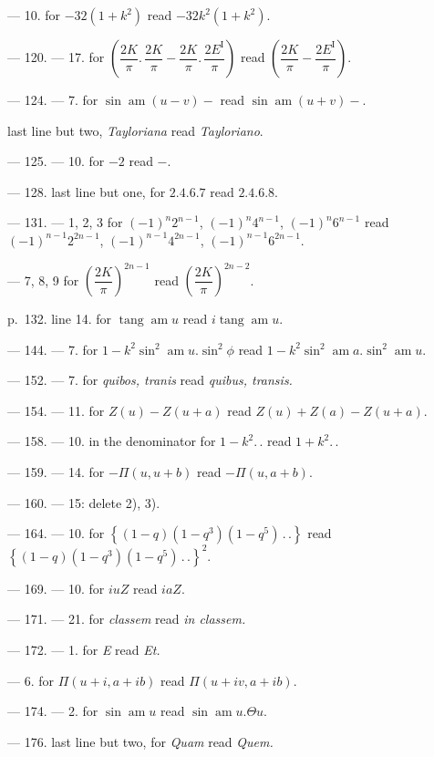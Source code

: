 \documentclass{article}
\begin{document}
--- 10. for $-32(1+k^{2})$ read $-32k^{2}(1+k^{2})$.

--- 120. --- 17. for $\left(\dfrac{2K}{\pi}.\,\dfrac{2K}{\pi}-\dfrac{2K}{\pi}.\,\dfrac{2E^{\mathrm{I}}}{\pi}\right)$ read $\left(\dfrac{2K}{\pi}-\dfrac{2E^{\mathrm{I}}}{\pi}\right)$.

--- 124. --- 7. for $\sin\operatorname{am}(u-v)-$ read $\sin\operatorname{am}(u+v)-$.

last line but two, \emph{Tayloriana} read \emph{Tayloriano}.

--- 125. --- 10. for $-2$ read $-$.

--- 128. last line but one, for $2.4.6.7$ read $2.4.6.8$.

--- 131. --- 1, 2, 3 for $(-1)^{n}2^{n-1}$, $(-1)^{n}4^{n-1}$, $(-1)^{n}6^{n-1}$ read $(-1)^{n-1}2^{2n-1}$, $(-1)^{n-1}4^{2n-1}$, $(-1)^{n-1}6^{2n-1}$.

--- 7, 8, 9 for $\left(\dfrac{2K}{\pi}\right)^{2n-1}$ read $\left(\dfrac{2K}{\pi}\right)^{2n-2}$.


p.\ 132. line 14. for $\operatorname{tang}\operatorname{am}u$ read $i\operatorname{tang}\operatorname{am}u$.

--- 144. --- 7. for $1-k^{2}\sin^{2}\operatorname{am}u.\sin^{2}\phi$ read $1-k^{2}\sin^{2}\operatorname{am}a.\sin^{2}\operatorname{am}u$.

--- 152. --- 7. for \emph{quibos, tranis} read \emph{quibus, transis.}

--- 154. --- 11. for $Z(u)-Z(u+a)$ read $Z(u)+Z(a)-Z(u+a)$.

--- 158. --- 10. in the denominator for $1-k^{2}.\,.$ read $1+k^{2}.\,.$

--- 159. --- 14. for $-\Pi(u,u+b)$ read $-\Pi(u,a+b)$.

--- 160. --- 15: delete 2), 3).

--- 164. --- 10. for $\left\{(1-q)(1-q^{3})(1-q^{5})\,.\,.\right\}$ read $\left\{(1-q)(1-q^{3})(1-q^{5})\,.\,.\right\}^{2}$.

--- 169. --- 10. for $iuZ$ read $iaZ$.

--- 171. --- 21. for \emph{classem} read \emph{in classem.}

--- 172. --- 1. for \emph{E} read \emph{Et.}

--- 6. for $\Pi(u+i,a+ib)$ read $\Pi(u+iv,a+ib)$.

--- 174. --- 2. for $\sin\operatorname{am}u$ read $\sin\operatorname{am}u.\Theta u$.

--- 176. last line but two, for \emph{Quam} read \emph{Quem.}
\end{document}

